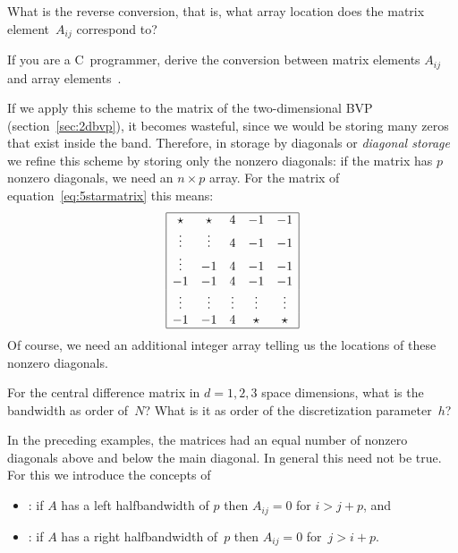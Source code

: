 \begin{exercise}
  What is the reverse conversion, that is, what array location
   does the matrix element~$A_{ij}$ correspond to?
\end{exercise}

\begin{exercise}
  If you are a C~programmer, derive the conversion between matrix
  elements $A_{ij}$ and array elements~.
\end{exercise}

If we apply this scheme to the matrix of the two-dimensional \ac{BVP}
(section~\ref{sec:2dbvp}), it becomes wasteful, since we would be
storing many zeros that exist inside the band.
Therefore, in storage by diagonals or
\emph{diagonal storage}
we refine
this scheme by storing only the nonzero diagonals: if the matrix has
$p$ nonzero diagonals, we need an $n\times p$ array. For the matrix of
equation~\eqref{eq:5starmatrix} this means:
\[
\begin{array}{|ccccc|}
  \hline
  \star&\star&4&-1&-1\\
  \vdots&\vdots&4&-1&-1\\
  \vdots&-1&4&-1&-1\\
  -1&-1&4&-1&-1\\
  \vdots&\vdots&\vdots&\vdots&\vdots\\
  -1&-1&4&\star&\star\\ \hline
\end{array}
\]
Of course, we need an additional integer array telling us the
locations of these nonzero diagonals.

\begin{exercise}
  For the central difference matrix in $d=1,2,3$ space dimensions,
  what is the bandwidth as order of~$N$? What is it as order of the
  discretization parameter~$h$?
\end{exercise}

In the preceding examples, the matrices had an equal number of nonzero
diagonals above and below the main diagonal. In general this need not
be true. For this we introduce the concepts of
\begin{itemize}
\item {}: if $A$ has a left
  halfbandwidth of $p$ then $A_{ij}=0$ for $i>j+p$, and
\item {}: if $A$ has a right
  halfbandwidth of~$p$ then $A_{ij}=0$ for~\mbox{$j>i+p$}.
\end{itemize}

